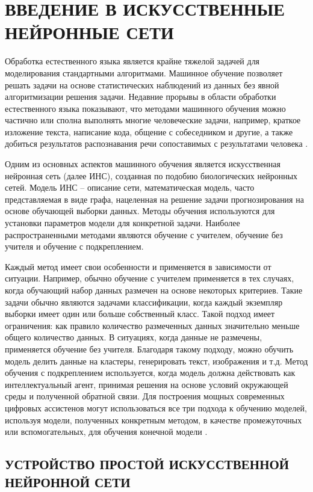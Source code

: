 \section{ВВЕДЕНИЕ В ИСКУССТВЕННЫЕ НЕЙРОННЫЕ СЕТИ}
Обработка естественного языка является крайне тяжелой задачей для моделирования стандартными алгоритмами. Машинное обучение позволяет решать задачи на основе статистических наблюдений из данных без явной алгоритмизации решения задачи. Недавние прорывы в области обработки естественного языка показывают, что методами машинного обучения можно частично или сполна выполнять многие человеческие задачи, например, краткое изложение текста, написание кода, общение с собеседником и другие, а также добиться результатов распознавания речи сопоставимых с результатами человека \cite{human-wer,whisper}.

Одним из основных аспектов машинного обучения является искусственная нейронная сеть (далее ИНС), созданная по подобию биологических нейронных сетей. Модель ИНС -- описание сети, математическая модель, часто представляемая в виде графа, нацеленная на решение задачи прогнозирования на основе обучающей выборки данных. Методы обучения используются для установки параметров модели для конкретной задачи. Наиболее распространенными методами являются обучение с учителем, обучение без учителя и обучение с подкреплением.

Каждый метод имеет свои особенности и применяется в зависимости от ситуации. Например, обычно обучение с учителем применяется в тех случаях, когда обучающий набор данных размечен на основе некоторых критериев. Такие задачи обычно являются задачами классификации, когда каждый экземпляр выборки имеет один или больше собственный класс. Такой подход имеет ограничения: как правило количество размеченных данных значительно меньше общего количество данных. В ситуациях, когда данные не размечены, применяется обучение без учителя. Благодаря такому подходу, можно обучить модель делить данные на кластеры, генерировать текст, изображения и т.д. Метод обучения с подкреплением используется, когда модель должна действовать как интеллектуальный агент, принимая решения на основе условий окружающей среды и полученной обратной связи. Для построения мощных современных цифровых ассистенов могут использоваться все три подхода к обучению моделей, используя модели, полученных конкретным методом, в качестве промежуточных или вспомогательных, для обучения конечной модели \cite{state-of-gpt}.

\subsection{УСТРОЙСТВО ПРОСТОЙ ИСКУССТВЕННОЙ НЕЙРОННОЙ СЕТИ}

